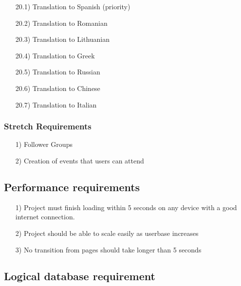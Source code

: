 \documentclass[10pt,a4paper]{article}
\begin{document}
\begin{itemize}
\item[20.1)]
Translation to Spanish (priority)

\item[20.2)]
Translation to Romanian

\item[20.3)]
Translation to Lithuanian

\item[20.4)]
Translation to Greek

\item[20.5)]
Translation to Russian

\item[20.6)]
Translation to Chinese

\item[20.7)]
Translation to Italian


\end{itemize}

\subsubsection{Stretch Requirements}

\begin{itemize}

\item[1)]
Follower Groups

\item[2)]
Creation of events that users can attend

\end{itemize}

\subsection{Performance requirements}

\begin{itemize}

\item[1)]
Project must finish loading within 5 seconds on any device with a good internet connection.

\item[2)]
Project should be able to scale easily as userbase increases

\item[3)]
No transition from pages should take longer than 5 seconds

\end{itemize}

\subsection{Logical database requirement}
\end{document}
